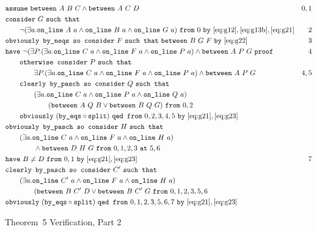 \begin{boxedfigure}
\scriptsize
  \begin{align*}
    &\code{assume}\ \between{A}{B}{C} \wedge \between{A}{C}{D} & 0,1\\
    &\code{consider}\ G\ \code{such that}\\
    &\qquad\Triangle{a}{A}{B}{G}\ \code{from}\ 0\ \code{by}\ \eqref{eq:g12},\eqref{eq:g13b},\eqref{eq:g21}&2\\
    &\code{obviously by\_neqs so consider}\ F\ \code{such that}\ \between{B}{G}{F}\ \code{by}\ \eqref{eq:g22}&3\\
    &\code{have}\ \neg(\exists P. (\exists a. \code{on\_line}\ C\ a\wedge\code{on\_line}\ F\ a\wedge\code{on\_line}\ P\ a)\wedge\between{A}{P}{G}\ \code{proof} & 4\\
    &\qquad \code{otherwise consider}\ P\ \code{such that}\\
    &\qquad\qquad \exists P. (\exists a. \code{on\_line}\ C\ a\wedge\code{on\_line}\ F\ a\wedge\code{on\_line}\ P\ a) \wedge\between{A}{P}{G}& 4,5\\
    &\qquad\code{clearly by\_pasch so consider}\ Q\ \code{such that}\\
    &\qquad\qquad(\exists a. \code{on\_line}\ C\ a\wedge\code{on\_line}\ P\ a\wedge\code{on\_line}\ Q\ a)\\
    &\qquad\qquad\qquad(\between{A}{Q}{B} \vee \between{B}{Q}{G})\ \code{from}\ 0,2\\
    &\qquad\code{obviously}\ (\code{by\_eqs}\circ\code{split})\ \code{qed from}\ 0,2,3,4,5\ \code{by}\ \eqref{eq:g21},\eqref{eq:g23}\\
    &\code{obviously by\_pasch so consider}\ H\ \code{such that}\\
    &\qquad(\exists a. \code{on\_line}\ C\ a\wedge\code{on\_line}\ F\ a\wedge\code{on\_line}\ H\ a)\\
    &\qquad\qquad\wedge\between{D}{H}{G}\ \code{from}\ 0,1,2,3\ \code{at}\ 5,6\\
    &\code{have}\ B\neq D\ \code{from}\ 0,1\ \code{by}\ \eqref{eq:g21},\eqref{eq:g23} & 7\\
    &\code{clearly by\_pasch so consider}\ C'\ \code{such that}\\
    &\qquad (\exists a. \code{on\_line}\ C'\ a\wedge\code{on\_line}\ F\ a\wedge\code{on\_line}\ H\ a)\\
    &\qquad\qquad(\between{B}{C'}{D} \vee \between{B}{C'}{G}\ \code{from}\ 0,1,2,3,5,6\\
    &\code{obviously}\ (\code{by\_eqs}\circ\code{split})\ \code{qed from}\ 0,1,2,3,5,6,7\ \code{by}\ \eqref{eq:g21},\eqref{eq:g23}
  \end{align*}
  \caption{Theorem~5 Verification, Part 2}
  \label{fig:FiveVerification2}
\end{boxedfigure}

